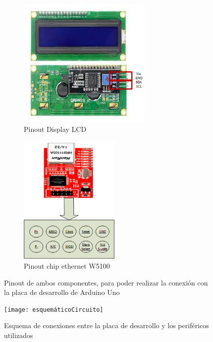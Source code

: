 
\begin{figure}[H]
   \setlength{\textwidth}{190mm}
	\vspace{-3mm}
	\begin{subfigure}{0.5\textwidth}
		\centering	
		\includegraphics[height=6.3cm]{pinout LCD}
		\caption{Pinout Display LCD }		
	\end{subfigure}
	\hspace{-30mm}
	\begin{subfigure}{0.5\textwidth}		
		\centering
		 
		\includegraphics[height=6.3cm]{pinoutW5100}
		\caption{Pinout chip ethernet W5100}	
	\end{subfigure}
	
	\caption{Pinout de ambos componentes, para poder realizar la conexión con la placa de desarrollo de Arduino Uno}
	\label{fig:pinoutlcdeth}
\end{figure}
\setlength{\textwidth}{150mm}

\begin{figure}[ht!]
	\centering 
	\texttt{[image: esquemáticoCircuito]}
	\caption{Esquema de conexiones entre la placa de desarrollo y los periféricos utilizados} 
	\label{fig:esq_completo} 
\end{figure}

